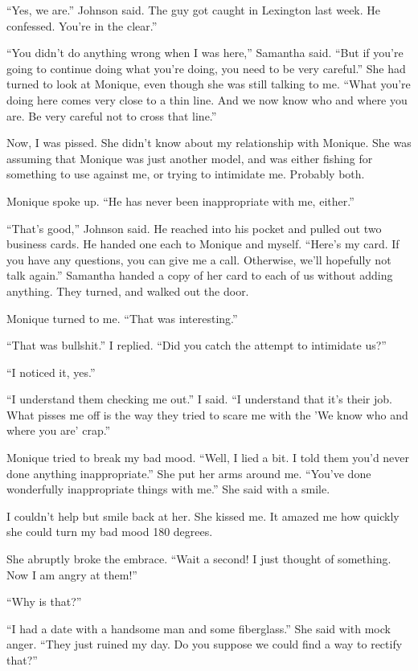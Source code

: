 ``Yes, we are.'' Johnson said. The guy got caught in Lexington last week. He confessed.
You're in the clear.''

``You didn't do anything wrong when I was here,'' Samantha said. ``But if you're going to
continue doing what you're doing, you need to be very careful.'' She had turned to look at
Monique, even though she was still talking to me. ``What you're doing here comes very close to a
thin line. And we now know who and where you are. Be very careful not to cross that line.''

Now, I was pissed. She didn't know about my relationship with Monique. She was assuming
that Monique was just another model, and was either fishing for something to use against me, or
trying to intimidate me. Probably both.

Monique spoke up. ``He has never been inappropriate with me, either.''

``That's good,'' Johnson said. He reached into his pocket and pulled out two business cards.
He handed one each to Monique and myself. ``Here's my card. If you have any questions, you can
give me a call. Otherwise, we'll hopefully not talk again.'' Samantha handed a copy of her card
to each of us without adding anything. They turned, and walked out the door.

Monique turned to me. ``That was interesting.''

``That was bullshit.'' I replied. ``Did you catch the attempt to intimidate us?''

``I noticed it, yes.''

``I understand them checking me out.'' I said. ``I understand that it's their job. What pisses
me off is the way they tried to scare me with the 'We know who and where you are' crap.''

Monique tried to break my bad mood. ``Well, I lied a bit. I told them you'd never done
anything inappropriate.'' She put her arms around me. ``You've done wonderfully inappropriate
things with me.'' She said with a smile.

I couldn't help but smile back at her. She kissed me. It amazed me how quickly she could
turn my bad mood 180 degrees.

She abruptly broke the embrace. ``Wait a second! I just thought of something. Now I am angry
at them!''

``Why is that?''

``I had a date with a handsome man and some fiberglass.'' She said with mock anger. ``They
just ruined my day. Do you suppose we could find a way to rectify that?''

